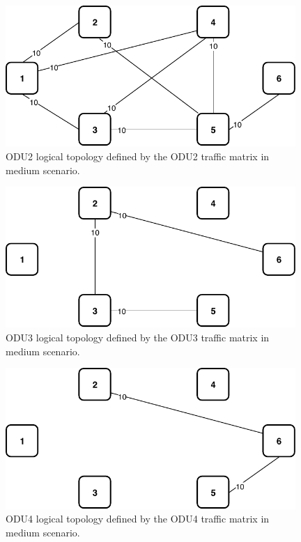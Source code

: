 \begin{figure}[h!]
\centering
\includegraphics[width=11cm]{sdf/ilp/opaque_survivability/figures/logical_topology_ODU2_medium}
\caption{ODU2 logical topology defined by the ODU2 traffic matrix in medium scenario.}
\label{logical_ODU2_medium}
\end{figure}
\vspace{13pt}
\begin{figure}[h!]
\centering
\includegraphics[width=11cm]{sdf/ilp/opaque_survivability/figures/logical_topology_ODU3_medium}
\caption{ODU3 logical topology defined by the ODU3 traffic matrix in medium scenario.}
\label{logical_ODU3_medium}
\end{figure}
\vspace{13pt}
\begin{figure}[h!]
\centering
\includegraphics[width=11cm]{sdf/ilp/opaque_survivability/figures/logical_topology_ODU4_medium}
\caption{ODU4 logical topology defined by the ODU4 traffic matrix in medium scenario.}
\label{logical_ODU4_medium}
\end{figure}
\newpage
